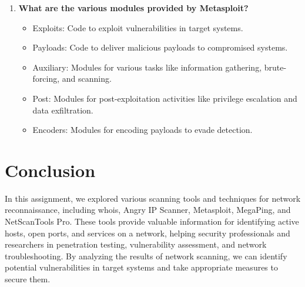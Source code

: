 \documentclass[11pt]{article}
\begin{document}
\begin{enumerate}
    \item \textbf{What are the various modules provided by Metasploit?}
          \begin{itemize}
              \item Exploits: Code to exploit vulnerabilities in target systems.
              \item Payloads: Code to deliver malicious payloads to compromised systems.
              \item Auxiliary: Modules for various tasks like information gathering, brute-forcing, and scanning.
              \item Post: Modules for post-exploitation activities like privilege escalation and data exfiltration.
              \item Encoders: Modules for encoding payloads to evade detection.
          \end{itemize}
\end{enumerate}

\section{Conclusion}
In this assignment, we explored various scanning tools and techniques for network reconnaissance, including whois, Angry IP Scanner, Metasploit, MegaPing, and NetScanTools Pro. These tools provide valuable information for identifying active hosts, open ports, and services on a network, helping security professionals and researchers in penetration testing, vulnerability assessment, and network troubleshooting. By analyzing the results of network scanning, we can identify potential vulnerabilities in target systems and take appropriate measures to secure them.
\clearpage

\pagebreak
\end{document}

